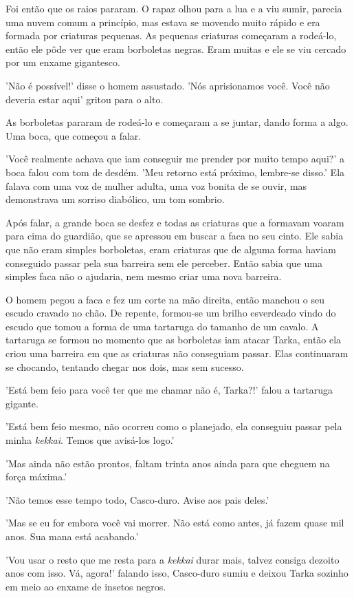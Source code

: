 Foi então que os raios pararam. O rapaz olhou para a lua e a viu sumir, parecia uma nuvem comum a princípio, mas estava se movendo muito rápido e era formada por criaturas pequenas. As pequenas criaturas começaram a rodeá-lo, então ele pôde ver que eram borboletas negras. Eram muitas e ele se viu cercado por um enxame gigantesco.

'Não é possível!' disse o homem assustado. 'Nós aprisionamos você. Você não deveria estar aqui' gritou para o alto.

As borboletas pararam de rodeá-lo e começaram a se juntar, dando forma a algo. Uma boca, que começou a falar.

'Você realmente achava que iam conseguir me prender por muito tempo aqui?' a boca falou com tom de desdém. 'Meu retorno está próximo, lembre-se disso.' Ela falava com uma voz de mulher adulta, uma voz bonita de se ouvir, mas demonstrava um sorriso diabólico, um tom sombrio.

Após falar, a grande boca se desfez e todas as criaturas que a formavam voaram para cima do guardião, que se apressou em buscar a faca no seu cinto. Ele sabia que não eram simples borboletas, eram criaturas que de alguma forma haviam conseguido passar pela sua barreira sem ele perceber. Então sabia que uma simples faca não o ajudaria, nem mesmo criar uma nova barreira. 

O homem pegou a faca e fez um corte na mão direita, então manchou o seu escudo cravado no chão. De repente, formou-se um brilho esverdeado vindo do escudo que tomou a forma de uma tartaruga do tamanho de um cavalo. A tartaruga se formou no momento que as borboletas iam atacar Tarka, então ela criou uma barreira em que as criaturas não conseguiam passar. Elas continuaram se chocando, tentando chegar nos dois, mas sem sucesso.

'Está bem feio para você ter que me chamar não é, Tarka?!' falou a tartaruga gigante.

'Está bem feio mesmo, não ocorreu como o planejado, ela conseguiu passar pela minha \textit{kekkai}. Temos que avisá-los logo.'

'Mas ainda não estão prontos, faltam trinta anos ainda para que cheguem na força máxima.'

'Não temos esse tempo todo, Casco-duro. Avise aos pais deles.'

'Mas se eu for embora você vai morrer. Não está como antes, já fazem quase mil anos. Sua mana está acabando.'

'Vou usar o resto que me resta para a \textit{kekkai} durar mais, talvez consiga dezoito anos com isso. Vá, agora!' falando isso, Casco-duro sumiu e deixou Tarka sozinho em meio ao enxame de insetos negros.

